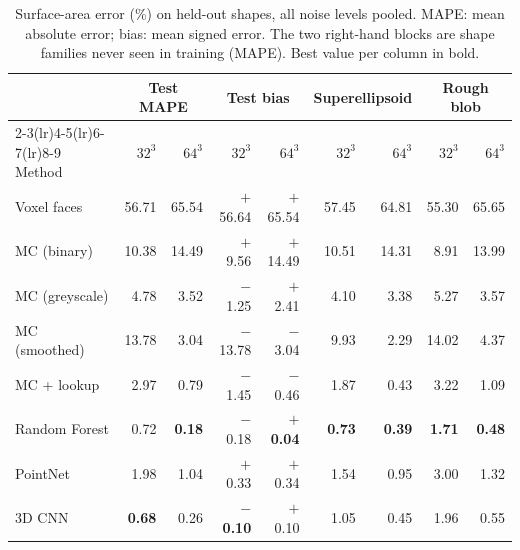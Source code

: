 \begin{table}[t]
  \centering\footnotesize
  \caption{Surface-area error (\%) on held-out shapes, all noise levels pooled. MAPE: mean absolute error; bias: mean signed error. The two right-hand blocks are shape families never seen in training (MAPE). Best value per column in bold.}
  \label{tab:main}
  \setlength{\tabcolsep}{3.5pt}
  \begin{tabular}{lrrrrrrrr}
    \toprule
    & \multicolumn{2}{c}{Test MAPE} & \multicolumn{2}{c}{Test bias} & \multicolumn{2}{c}{Superellipsoid} & \multicolumn{2}{c}{Rough blob} \\
    \cmidrule(lr){2-3}\cmidrule(lr){4-5}\cmidrule(lr){6-7}\cmidrule(lr){8-9}
    Method & $32^3$ & $64^3$ & $32^3$ & $64^3$ & $32^3$ & $64^3$ & $32^3$ & $64^3$ \\
    \midrule
    Voxel faces & 56.71 & 65.54 & $+$56.64 & $+$65.54 & 57.45 & 64.81 & 55.30 & 65.65 \\
    MC (binary) & 10.38 & 14.49 & $+$9.56 & $+$14.49 & 10.51 & 14.31 & 8.91 & 13.99 \\
    MC (greyscale) & 4.78 & 3.52 & $-$1.25 & $+$2.41 & 4.10 & 3.38 & 5.27 & 3.57 \\
    MC (smoothed) & 13.78 & 3.04 & $-$13.78 & $-$3.04 & 9.93 & 2.29 & 14.02 & 4.37 \\
    \midrule
    MC + lookup & 2.97 & 0.79 & $-$1.45 & $-$0.46 & 1.87 & 0.43 & 3.22 & 1.09 \\
    Random Forest & 0.72 & \textbf{0.18} & $-$0.18 & \textbf{$+$0.04} & \textbf{0.73} & \textbf{0.39} & \textbf{1.71} & \textbf{0.48} \\
    PointNet & 1.98 & 1.04 & $+$0.33 & $+$0.34 & 1.54 & 0.95 & 3.00 & 1.32 \\
    3D CNN & \textbf{0.68} & 0.26 & \textbf{$-$0.10} & $+$0.10 & 1.05 & 0.45 & 1.96 & 0.55 \\
    \bottomrule
  \end{tabular}
\end{table}
